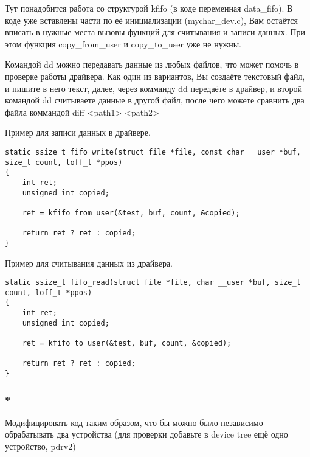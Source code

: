 Тут понадобится работа со структурой kfifo (в коде переменная data\_fifo). В коде уже вставлены части по её инициализации (mychar\_dev.c), Вам остаётся вписать в нужные места вызовы функций для считывания и записи данных. При этом функция copy\_from\_user и copy\_to\_user уже не нужны.

Командой dd можно передавать данные из любых файлов, что может помочь в проверке работы драйвера. Как один из вариантов, Вы создаёте текстовый файл, и пишите в него текст, далее, через комманду dd передаёте в драйвер, и второй командой dd считываете данные в другой файл, после чего можете сравнить два файла коммандой diff <path1> <path2>

Пример для записи данных в драйвере.
\begin{lstlisting}[style=stdout]
static ssize_t fifo_write(struct file *file, const char __user *buf, size_t count, loff_t *ppos)
{
	int ret;
	unsigned int copied;
	
	ret = kfifo_from_user(&test, buf, count, &copied);
	
	return ret ? ret : copied;
}
\end{lstlisting}


Пример для считывания данных из драйвера.
\begin{lstlisting}[style=stdout]
static ssize_t fifo_read(struct file *file, char __user *buf, size_t count, loff_t *ppos)
{
	int ret;
	unsigned int copied;
	
	ret = kfifo_to_user(&test, buf, count, &copied);
	
	return ret ? ret : copied;
}
\end{lstlisting}

\subsubsection{*} Модифицировать код таким образом, что бы  можно было независимо обрабатывать два устройства (для проверки добавьте в device tree ещё одно устройство, pdrv2)
